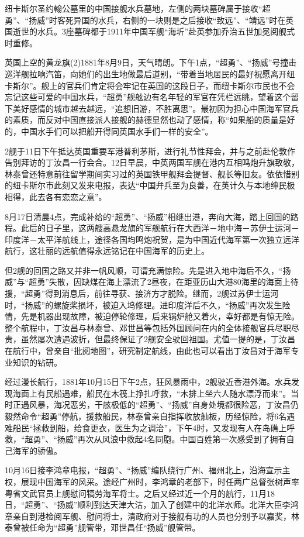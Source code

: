 \documentclass[12pt,UTF8]{ctexbook}
\begin{document}
纽卡斯尔圣约翰公墓里的中国接舰水兵墓地，左侧的两块墓碑属于接收“超勇”、“扬威”时客死异国的水兵，右侧的一块则是之后接收“致远”、“靖远”时在英国逝世的水兵。3座墓碑都于1911年中国军舰“海圻”赴英参加乔治五世加冕阅舰式时重修。

英国上空的黄龙旗(2)1881年8月9日，天气晴朗。下午1点，“超勇”、“扬威”号撞击巡洋舰拉响汽笛，向她们的出生地做最后道别，“带着当地居民的最好祝愿离开纽卡斯尔”。舰上的官兵们肯定将会牢记在英国的这段日子，而纽卡斯尔市民也不会忘记这些可爱的中国水兵，“超勇”舰舷边有名年轻的军官在凭栏远眺，望着这个留下美好感情的城市越去越远，“追想旧游，不胜离思”。最初因为担心中国海军官兵的素质，而反对中国直接派人接舰的赫德显然也动了感情，称“如果船的质量是好的，中国水手们可以把船开得同英国水手们一样的安全”。

2舰于11日下午抵达英国重要军港普利茅斯，进行礼节性拜会，并与之前赴伦敦作告别拜访的丁汝昌一行会合。12日早晨，中英两国军舰在港内互相鸣炮升旗致敬，林泰曾还特意前往留学期间实习过的英国铁甲舰拜会提督、舰长等旧友。依依惜别的纽卡斯尔市此刻又发来电报，表达“中国弁兵至为良善，在英计久与本地绅民极相得，此去各有恋恋之意”。

8月17日清晨4点，完成补给的“超勇”、“扬威”相继出港，奔向大海，踏上回国的路程。此后的日子里，这两艘高悬龙旗的军舰航行在大西洋－地中海－苏伊士运河－印度洋－太平洋航线上，途径各国均鸣炮祝贺，是为中国近代海军第一次独立远洋航行，这壮丽的远航值得永远铭记在中国海军的历史上。

但2舰的回国之路又并非一帆风顺，可谓充满惊险。先是进入地中海后不久，“扬威”与“超勇”失散，因缺煤在海上漂流了2昼夜，在距亚历山大港80海里的海面上待援，“超勇”得到消息后，前往寻获、接济方才脱险。继而，2舰过苏伊士运河时，“扬威”的螺旋桨损坏，被迫入坞修理。进印度洋后不久，“扬威”再次发生险情，先是机器出现故障，被迫停轮修理，后来锅炉舱又着火，幸好都是有惊无险。整个航程中，丁汝昌与林泰曾、邓世昌等包括外国顾问在内的全体接舰官兵尽职尽责，虽然屡次遭遇波折，但最终保证了2舰安全驶回祖国。尤值一提的是，丁汝昌在航行中，曾亲自“批阅地图”，研究制定航线，由此也可以看出丁汝昌对于海军专业知识的钻研。

经过漫长航行，1881年10月15日下午2点，狂风暴雨中，2舰驶近香港外海。水兵发现海面上有民船遇难，船民在木筏上挣扎呼救，“木排上坐六人随水漂浮而来”。当时正遇风暴，海况恶劣，干舷极低的“超勇”、“扬威”自身处境都很险恶，丁汝昌仍毅然命令“超勇”停航，援救船民，林泰曾亲自指挥收放舢板，历经惊险，将6名遇难船民“拯救到船，给食更衣，医生为之调治”，下午4时，又发现有人在岛礁上呼救，“超勇”、“扬威”再次从风浪中救起4名同胞。中国百姓第一次感受到了拥有自己海军的骄傲。

10月16日接李鸿章电报，“超勇”、“扬威”编队绕行广州、福州北上，沿海宣示主权，展现中国海军的风采。途经广州时，李鸿章的老部下，时任两广总督张树声率粤省文武官员上舰慰问犒劳海军将士。之后又经过近一个月的航行，11月18日，“超勇”、“扬威”顺利到达天津大沽，加入了创建中的北洋水师。北洋大臣李鸿章亲自到港检阅军舰、慰问将士，清政府对于接舰有功的人员也分别予以嘉奖，林泰曾被任命为“超勇”舰管带，邓世昌任“扬威”舰管带。
\end{document}
